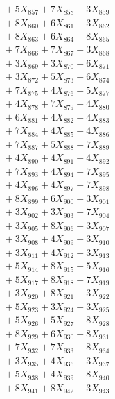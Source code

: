 \documentclass[a4paper,10pt]{article}
\begin{document}
{\begin{align}
&\;  + 5 X_{857} + 7 X_{858} + 3 X_{859} \\[0.3ex]
&\;  + 8 X_{860} + 6 X_{861} + 3 X_{862} \\[0.3ex]
&\;  + 8 X_{863} + 6 X_{864} + 8 X_{865} \\[0.3ex]
&\;  + 7 X_{866} + 7 X_{867} + 3 X_{868} \\[0.3ex]
&\;  + 3 X_{869} + 3 X_{870} + 6 X_{871} \\[0.3ex]
&\;  + 3 X_{872} + 5 X_{873} + 6 X_{874} \\[0.3ex]
&\;  + 7 X_{875} + 4 X_{876} + 5 X_{877} \\[0.3ex]
&\;  + 4 X_{878} + 7 X_{879} + 4 X_{880} \\[0.5ex]\allowbreak
&\;  + 6 X_{881} + 4 X_{882} + 4 X_{883} \\[0.3ex]
&\;  + 7 X_{884} + 4 X_{885} + 4 X_{886} \\[0.3ex]
&\;  + 7 X_{887} + 5 X_{888} + 7 X_{889} \\[0.3ex]
&\;  + 4 X_{890} + 4 X_{891} + 4 X_{892} \\[0.3ex]
&\;  + 7 X_{893} + 4 X_{894} + 7 X_{895} \\[0.3ex]
&\;  + 4 X_{896} + 4 X_{897} + 7 X_{898} \\[0.3ex]
&\;  + 8 X_{899} + 6 X_{900} + 3 X_{901} \\[0.3ex]
&\;  + 3 X_{902} + 3 X_{903} + 7 X_{904} \\[0.3ex]
&\;  + 3 X_{905} + 8 X_{906} + 3 X_{907} \\[0.3ex]
&\;  + 3 X_{908} + 4 X_{909} + 3 X_{910} \\[0.5ex]\allowbreak
&\;  + 3 X_{911} + 4 X_{912} + 3 X_{913} \\[0.3ex]
&\;  + 5 X_{914} + 8 X_{915} + 5 X_{916} \\[0.3ex]
&\;  + 5 X_{917} + 8 X_{918} + 7 X_{919} \\[0.3ex]
&\;  + 3 X_{920} + 8 X_{921} + 3 X_{922} \\[0.3ex]
&\;  + 5 X_{923} + 3 X_{924} + 3 X_{925} \\[0.3ex]
&\;  + 5 X_{926} + 5 X_{927} + 8 X_{928} \\[0.3ex]
&\;  + 8 X_{929} + 6 X_{930} + 8 X_{931} \\[0.3ex]
&\;  + 7 X_{932} + 7 X_{933} + 8 X_{934} \\[0.3ex]
&\;  + 3 X_{935} + 4 X_{936} + 3 X_{937} \\[0.3ex]
&\;  + 5 X_{938} + 4 X_{939} + 8 X_{940} \\[0.5ex]\allowbreak
&\;  + 8 X_{941} + 8 X_{942} + 3 X_{943} \\[0.3ex]

\end{align}}
\end{document}
